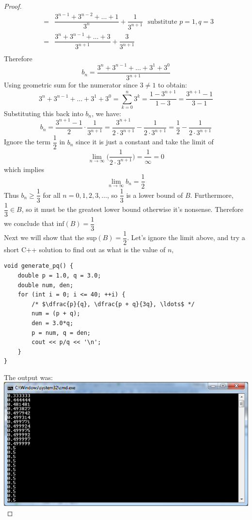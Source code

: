 \documentclass[10pt,letterpaper]{article}
\begin{document}
\begin{enumerate}[(i)]
\begin{proof}
\begin{eqnarray*}
				&=& \dfrac{3^{n-1} + 3^{n-2} + \ldots + 1}{3^n} + \dfrac{1}{3^{n+1}} \, \, \text{ substitute } p = 1, q = 3\\
				&=& \dfrac{3^n + 3^{n-1} + \ldots + 3}{3^{n+1}} + \dfrac{3}{3^{n+1}} \\
		\end{eqnarray*}	
		Therefore	
		$$
			b_n	= \dfrac{3^n + 3^{n-1} + \ldots + 3^1 + 3^0}{3^{n+1}}
		$$	
		Using geometric sum for the numerator since $3 \neq 1$ to obtain:
		$$3^n + 3^{n-1} + \ldots + 3^1 + 3^0 = \displaystyle\sum_{k=0}^{n}3^k = \dfrac{1 - 3^{n+1}}{1 - 3} 
		= \dfrac{3^{n+1} - 1}{3 - 1}$$
		Substituting this back into $b_n$, we have:
		$$
		b_n	= \dfrac{3^{n+1} - 1}{2} \cdot \dfrac{1}{3^{n+1}} = \dfrac{3^{n+1}}{2 \cdot 3^{n+1}} - \dfrac{1}{2 \cdot 3^{n+1}}
		= \dfrac{1}{2} - \dfrac{1}{2 \cdot 3^{n+1}}
		$$
		Ignore the term $\dfrac{1}{2}$ in $b_n$ since it is just a constant and take the limit of 
		$$\displaystyle\lim_{n\to\infty}\bigg(\dfrac{1}{2 \cdot 3^{n+1}}\bigg) = \dfrac{1}{\infty} = 0$$
		which implies $$\displaystyle\lim_{n\to\infty}b_n = \dfrac{1}{2}$$
		Thus $b_n \geq \dfrac{1}{3}$ for all $n = 0, 1, 2, 3, \ldots$, so $\dfrac{1}{3}$ is a lower bound of $B$. Furthermore, 
		$\dfrac{1}{3} \in B$, so it must be the greatest lower bound otherwise it's nonsense. Therefore we conclude that
		$\mathrm{inf}(B) = \dfrac{1}{3}$ \\
		
		Next we will show that the $\mathrm{sup}(B) = \dfrac{1}{2}$. Let's ignore the limit above, and try a short C++ solution
		to find out as what is the value of $n$,
\begin{verbatim}
void generate_pq() {
	double p = 1.0, q = 3.0;
	double num, den;
	for (int i = 0; i <= 40; ++i) {
		/* $\dfrac{p}{q}, \dfrac{p + q}{3q}, \ldots$ */ 
		num = (p + q);	
		den = 3.0*q;
		p = num, q = den;
		cout << p/q << '\n';
	}
}		
\end{verbatim}
The output was: \\
	\includegraphics[scale=0.5]{hw3.png} \text{ } \\


\end{proof}
\end{enumerate}
\end{document}
